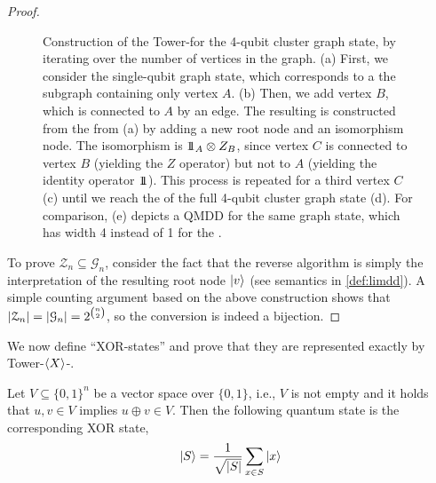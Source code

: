 \begin{proof}
\begin{figure}
\begin{centering}
	\caption{
		Construction of the Tower-\limdd for the 4-qubit cluster graph state, by iterating over the number of vertices in the graph.
    (a) First, we consider the single-qubit graph state, which corresponds to a the subgraph containing only vertex $A$.
    (b) Then, we add vertex $B$, which is connected to $A$ by an edge.
	The resulting \limdd is constructed from the \limdd from (a) by adding a new root node and an isomorphism node.
	The isomorphism is $1\!\!1_A \otimes Z_B$, since vertex $C$ is connected to vertex $B$ (yielding the $Z$ operator) but not to $A$ (yielding the identity operator $1\!\!1$).
    This process is repeated for a third vertex $C$ (c) until we reach the \limdd of the full 4-qubit cluster graph state (d).
	For comparison, (e) depicts a QMDD for the same graph state, which has width 4 instead of 1 for the \limdd.
		\label{fig:graph-state-as-line-iso-qmdd}
		}
    \end{centering}
\end{figure}


    To prove $\mathcal{Z}_n \subseteq \mathcal{G}_n$, consider the fact that the reverse algorithm is simply the interpretation of the resulting root node $\ket v$ (see semantics in \autoref{def:limdd}).
A simple counting argument based on the above construction shows that $\left\vert{\mathcal{Z}_n}\right\vert = \left\vert{\mathcal{G}_n}\right\vert = 2^{n \choose 2}$, so the conversion is indeed a bijection.
\end{proof}


We now define ``XOR-states'' and prove that they are represented exactly by Tower-$\braket{X}$-\limdds.

\begin{definition}
	Let $V\subseteq\{0,1\}^n$ be a vector space over $\{0,1\}$, i.e., $V$ is not empty and it holds that $u,v\in V$ implies $u\oplus v\in V$.
	Then the following quantum state is the corresponding XOR state,
	\begin{align}
		\ket{S} = \frac{1}{\sqrt{|S|}}\sum_{x\in S}\ket{x}
	\end{align}
\end{definition}

